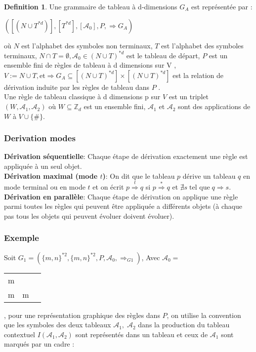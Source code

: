 \documentclass[12pt]{article}
\theoremstyle{definition}
\newtheorem{definition}{Definition}
\begin{document}
	\begin{definition}
		Une grammaire de tableau à d-dimensions $G_{A}$ est représentée par : \\
		{\par\centering 	$([(N \cup T^{*d})] , [T^{*d}] , [\mathcal{A}_{0}], P , \Longrightarrow G_{A})$ \par} 
		
		\medskip
		
		où $N$ est l'alphabet des symboles non terminaux, $T$ est l'alphabet des symboles terminaux, $N \cap T = \emptyset , \mathcal{A}_{0} \in (N \cup T)^{*d}$ est le tableau de départ, $P$ est un ensemble fini de règles de tableau à d dimensions sur V , $ V := N \cup T, \text{et} \Longrightarrow G_{A} \subseteq [(N \cup T)^{*d}] \times	[(N \cup T)^{*d}] $ est la relation de dérivation induite par les règles de tableau dans $P$ .\\
		
		Une règle de tableau classique à d dimensions p sur $V$ est un triplet $(W, \mathcal{A}_{1}, \mathcal{A}_{2})$ où $W \subseteq \mathbb{Z}_{d}$ est un ensemble fini,  $\mathcal{A}_{1}$ et $\mathcal{A}_{2}$ sont des applications de $W$ à $V \cup \{\#\}$. \\
		
	\end{definition}
	
	\subsubsection{Derivation modes}
	\textbf{Dérivation séquentielle}: Chaque étape de dérivation exactement une règle est appliquée à un seul objet.\\
	
	\textbf{Dérivation maximal (mode $t$)}: On dit que le tableau $p$ dérive un tableau $q$ en mode terminal ou en mode $t$ et on écrit $p \overset{t}\Longrightarrow q $ si $ p \overset{*}\Longrightarrow q $ et $ \nexists s \; \text{tel que} \; q \Longrightarrow s$. \\
	
	\textbf{Dérivation en parallèle}: Chaque étape de dérivation on applique une règle parmi toutes les règles qui peuvent être appliquée a différents objets (à chaque pas tous les objets qui peuvent évoluer doivent évoluer).\\
	
	\subsubsection{Exemple}
	Soit $G_{1} = (\{m,n\}^{*2}, \{m,n\}^{*2}, P , \mathcal{A}_{0}, \Longrightarrow_{G1})$, Avec $\mathcal{A}_{0} = $
	{\begin{tabular}{ccc}
			m  \\
			m & m  
	\end{tabular}}, pour une représentation graphique des règles dans $P$, on utilise la convention que les symboles des deux tableaux $\mathcal{A}_{1}, \; \mathcal{A}_{2}$ dans la production du tableau contextuel  $I(\mathcal{A}_{1},\mathcal{A}_{2})$ sont représentés dans un tableau et ceux de $\mathcal{A}_{1}$ sont marqués par un cadre : \\
	
\end{document}
